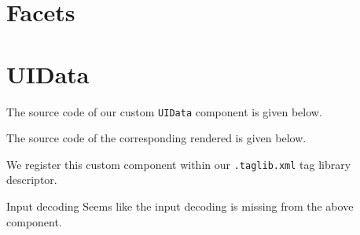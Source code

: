 \section{Facets}

\section{UIData}
The source code of our custom \texttt{UIData} component is given below.


The source code of the corresponding rendered is given below.


We register this custom component within our \texttt{.taglib.xml} tag library descriptor.


\begin{TODO}{Input decoding}
	Seems like the input decoding is missing from the above component.
\end{TODO}